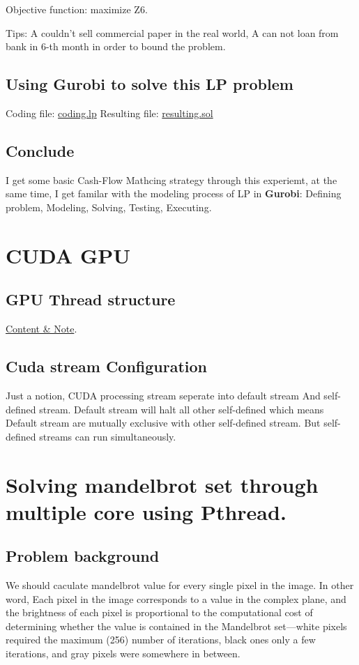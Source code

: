 \documentclass[a4paper]{article}
\begin{document}
Objective function: maximize Z6.

Tips: A couldn't sell commercial paper in the real world, A can not loan from bank in 6-th month in order to bound the problem.

\subsection{Using Gurobi to solve this LP problem}
Coding file: \href{https://github.com/GiganticRay/WeekReport/blob/main/2021/0802-0806/my.lp}{coding.lp} 
\newline
Resulting file: \href{https://github.com/GiganticRay/WeekReport/blob/main/2021/0802-0806/my.sol}{resulting.sol}

\subsection{Conclude}
I get some basic Cash-Flow Mathcing strategy through this experiemt, at the same time, I get familar with the modeling process of LP in \textbf{Gurobi}: Defining problem, Modeling, Solving, Testing, Executing.


\section{CUDA GPU}
\subsection{GPU Thread structure}
\href{https://github.com/GiganticRay/WeekReport/blob/main/2021/0802-0806/Cuda_Basic_Thread_Structure.pdf}{Content \& Note}.

\subsection{Cuda stream Configuration}
Just a notion, CUDA processing stream seperate into default stream And self-defined stream. Default stream will halt all other self-defined which means Default stream are mutually exclusive with other self-defined stream. But self-defined streams can run simultaneously.

\section{Solving mandelbrot set through multiple core using Pthread.}
\subsection{Problem background}
We should caculate mandelbrot value for every single pixel in the image. In other word, Each pixel in the image corresponds to a value in the complex
plane, and the brightness of each pixel is proportional to the computational cost of determining whether
the value is contained in the Mandelbrot set—white pixels required the maximum (256) number of iterations, black ones only a few iterations, and gray pixels were somewhere in between.
\end{document}
